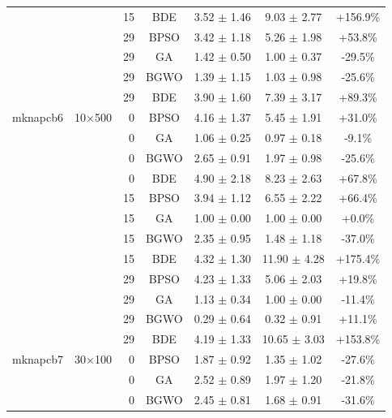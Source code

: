 \begin{table}[htbp]
\begin{tabular}{llrcccc}
             &          & 15 & BDE   & 3.52 $\pm$ 1.46    & 9.03 $\pm$ 2.77    & +156.9\% \\
             &          & 29 & BPSO  & 3.42 $\pm$ 1.18    & 5.26 $\pm$ 1.98    & +53.8\% \\
             &          & 29 & GA    & 1.42 $\pm$ 0.50    & 1.00 $\pm$ 0.37    & -29.5\% \\
             &          & 29 & BGWO  & 1.39 $\pm$ 1.15    & 1.03 $\pm$ 0.98    & -25.6\% \\
             &          & 29 & BDE   & 3.90 $\pm$ 1.60    & 7.39 $\pm$ 3.17    & +89.3\% \\
mknapcb6     & 10×500   & 0 & BPSO  & 4.16 $\pm$ 1.37    & 5.45 $\pm$ 1.91    & +31.0\% \\
             &          & 0 & GA    & 1.06 $\pm$ 0.25    & 0.97 $\pm$ 0.18    & -9.1\% \\
             &          & 0 & BGWO  & 2.65 $\pm$ 0.91    & 1.97 $\pm$ 0.98    & -25.6\% \\
             &          & 0 & BDE   & 4.90 $\pm$ 2.18    & 8.23 $\pm$ 2.63    & +67.8\% \\
             &          & 15 & BPSO  & 3.94 $\pm$ 1.12    & 6.55 $\pm$ 2.22    & +66.4\% \\
             &          & 15 & GA    & 1.00 $\pm$ 0.00    & 1.00 $\pm$ 0.00    & +0.0\% \\
             &          & 15 & BGWO  & 2.35 $\pm$ 0.95    & 1.48 $\pm$ 1.18    & -37.0\% \\
             &          & 15 & BDE   & 4.32 $\pm$ 1.30    & 11.90 $\pm$ 4.28   & +175.4\% \\
             &          & 29 & BPSO  & 4.23 $\pm$ 1.33    & 5.06 $\pm$ 2.03    & +19.8\% \\
             &          & 29 & GA    & 1.13 $\pm$ 0.34    & 1.00 $\pm$ 0.00    & -11.4\% \\
             &          & 29 & BGWO  & 0.29 $\pm$ 0.64    & 0.32 $\pm$ 0.91    & +11.1\% \\
             &          & 29 & BDE   & 4.19 $\pm$ 1.33    & 10.65 $\pm$ 3.03   & +153.8\% \\
mknapcb7     & 30×100   & 0 & BPSO  & 1.87 $\pm$ 0.92    & 1.35 $\pm$ 1.02    & -27.6\% \\
             &          & 0 & GA    & 2.52 $\pm$ 0.89    & 1.97 $\pm$ 1.20    & -21.8\% \\
             &          & 0 & BGWO  & 2.45 $\pm$ 0.81    & 1.68 $\pm$ 0.91    & -31.6\% \\

\end{tabular}
\end{table}
